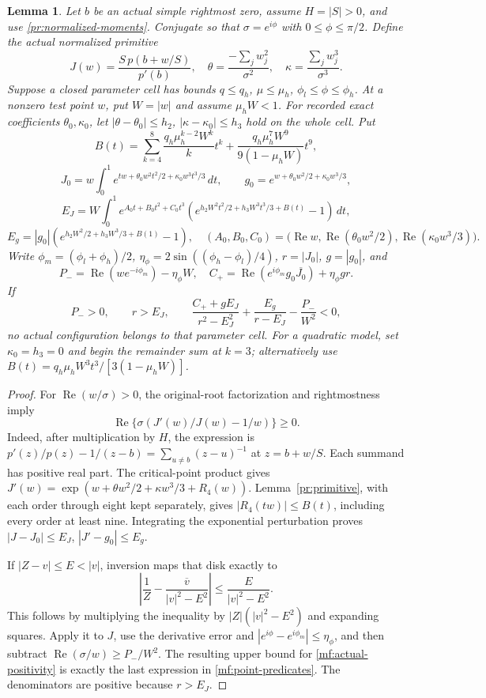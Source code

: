 \documentclass[11pt,reqno]{amsart}
\numberwithin{equation}{section}
\newtheorem{lemma}[theorem]{Lemma}
\theoremstyle{definition}
\theoremstyle{remark}
\renewcommand{\Re}{\operatorname{Re}}
\begin{document}
\begin{lemma}\label{mf:point-obstruction}
Let $b$ be an actual simple rightmost zero, assume $H=|S|>0$,
and use \eqref{pr:normalized-moments}. Conjugate so that
$\sigma=e^{i\phi}$ with $0\le\phi\le\pi/2$.
Define the actual normalized primitive
\[
 J(w)=\frac{S\,p(b+w/S)}{p'(b)},\quad
 \theta=\frac{-\sum_jw_j^2}{\sigma^2},\quad
 \kappa=\frac{\sum_jw_j^3}{\sigma^3}.
\]
Suppose a closed parameter cell has bounds $q\le q_h$,
$\mu\le\mu_h$, $\phi_l\le\phi\le\phi_h$.
At a nonzero test point $w$, put $W=|w|$ and assume $\mu_hW<1$.
For recorded exact coefficients $\theta_0,\kappa_0$, let
$|\theta-\theta_0|\le h_2$, $|\kappa-\kappa_0|\le h_3$
hold on the whole cell. Put
\[
 B(t)=\sum_{k=4}^8\frac{q_h\mu_h^{k-2}W^k}{k}t^k
       +\frac{q_h\mu_h^7W^9}{9(1-\mu_hW)}t^9,
\]
\[
 J_0=w\int_0^1e^{tw+\theta_0w^2t^2/2+\kappa_0w^3t^3/3}\,dt,
 \qquad g_0=e^{w+\theta_0w^2/2+\kappa_0w^3/3},
\]
\[
 E_J=W\int_0^1 e^{A_0t+B_0t^2+C_0t^3}
     \left(e^{h_2W^2t^2/2+h_3W^3t^3/3+B(t)}-1\right)\,dt,
\]
\[
 E_g=|g_0|\left(e^{h_2W^2/2+h_3W^3/3+B(1)}-1\right),
 \quad
 (A_0,B_0,C_0)=
 \bigl(\Re w,\Re(\theta_0w^2/2),\Re(\kappa_0w^3/3)\bigr).
\]
Write $\phi_m=(\phi_l+\phi_h)/2$,
$\eta_\phi=2\sin((\phi_h-\phi_l)/4)$, $r=|J_0|$, $g=|g_0|$,
and
\[
 P_-=\Re(we^{-i\phi_m})-\eta_\phi W,\quad
 C_+=\Re(e^{i\phi_m}g_0\overline{J_0})+\eta_\phi gr.
\]
If
\begin{equation}\label{mf:point-predicates}
 P_->0,\qquad r>E_J,\qquad
 \frac{C_++gE_J}{r^2-E_J^2}
       +\frac{E_g}{r-E_J}-\frac{P_-}{W^2}<0,
\end{equation}
no actual configuration belongs to that parameter cell.
For a quadratic model, set $\kappa_0=h_3=0$ and begin the
remainder sum at $k=3$; alternatively use
$B(t)=q_h\mu_hW^3t^3/[3(1-\mu_hW)]$.
\end{lemma}

\begin{proof}
For $\Re(w/\sigma)>0$, the original-root factorization
and rightmostness imply
\begin{equation}\label{mf:actual-positivity}
 \Re\{\sigma(J'(w)/J(w)-1/w)\}\ge0.
\end{equation}
Indeed, after multiplication by $H$, the expression is
$p'(z)/p(z)-1/(z-b)=\sum_{u\ne b}(z-u)^{-1}$ at
$z=b+w/S$. Each summand has positive real part.
The critical-point product gives
$J'(w)=\exp(w+\theta w^2/2+\kappa w^3/3+R_4(w))$.
Lemma~\ref{pr:primitive}, with each order through eight kept
separately, gives $|R_4(tw)|\le B(t)$, including every order
at least nine. Integrating the exponential
perturbation proves $|J-J_0|\le E_J$, $|J'-g_0|\le E_g$.

If $|Z-v|\le E<|v|$, inversion maps that disk exactly to
\[
 \left|\frac1Z-\frac{\overline v}{|v|^2-E^2}\right|
 \le\frac{E}{|v|^2-E^2}.
\]
This follows by multiplying the inequality by
$|Z|(|v|^2-E^2)$ and expanding squares.
Apply it to $J$, use the derivative error and
$|e^{i\phi}-e^{i\phi_m}|\le\eta_\phi$, and then subtract
$\Re(\sigma/w)\ge P_-/W^2$.
The resulting upper bound for \eqref{mf:actual-positivity}
is exactly the last expression in \eqref{mf:point-predicates}.
The denominators are positive because $r>E_J$.
\end{proof}
\end{document}
